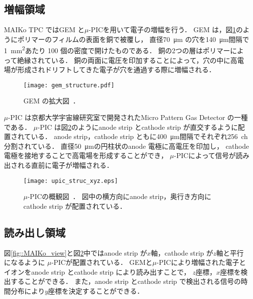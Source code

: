 \documentclass[../master]{subfiles}
\begin{document}
\subsection{増幅領域}
MAIKo TPC ではGEM と$\mu$-PICを用いて電子の増幅を行う．
GEM は，図\ref{pic::GEM}のようにポリマーのフィルムの表面を銅で被覆し，
直径\SI{70}{\micro\metre} の穴を\SI{140}{\micro\metre}間隔で\SI{1}{\square\milli\metre}あたり
100 個の密度で開けたものである．
銅の2つの層はポリマーによって絶縁されている．
銅の両面に電圧を印加することによって，穴の中に高電場が形成されドリフトしてきた電子が穴を通過する際に増幅される．
\begin{figure}
  \centering
  \texttt{[image: gem\_structure.pdf]}
  \caption{GEM の拡大図~\cite{gem_compass}．}
  \label{pic::GEM}  
\end{figure}

$\mu$-PIC は京都大学宇宙線研究室で開発されたMicro Pattern Gas Detector の一種である．
$\mu$-PIC は図\ref{fig::mupic}のようにanode strip とcathode strip が直交するように配置されている．
anode strip，cathode strip ともに\SI{400}{\micro\metre}間隔でそれぞれ256~ch分割されている．
直径\SI{50}{\micro\metre}の円柱状のanode 電極に高電圧を印加し，
cathode 電極を接地することで高電場を形成することができ，
$\mu$-PICによって信号が読み出される直前に電子が増幅される．
\begin{figure}
  \centering
  \texttt{[image: upic\_struc\_xyz.eps]}
  \caption[$\mu$-PICの概観図．]{$\mu$-PICの概観図~\cite{mupic}．
    図中の横方向にanode strip，奥行き方向にcathode strip が配置されている．
  }
  \label{fig::mupic}
\end{figure}

\subsection{読み出し領域}
\label{sec::mu-pic}
図\ref{fig::MAIKo_view}と図\ref{fig::mupic}中ではanode strip が$x$軸，cathode strip が$z$軸と平行になるように
$\mu$-PICが配置されている．
GEMと$\mu$-PICにより増幅された電子とイオンをanode strip とcathode strip により読み出すことで，
$z$座標，$x$座標を検出することができる．
また，anode strip とcathode strip で検出される信号の時間分布により$y$座標を決定することができる．
\end{document}
